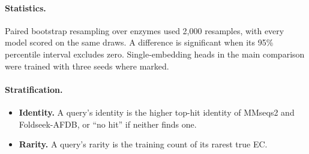 \documentclass[11pt]{article}
\begin{document}
\paragraph{Statistics.} Paired bootstrap resampling over enzymes \cite{efron1993} used 2,000 resamples, with every model
scored on the same draws. A difference is significant when its 95\% percentile interval excludes zero. Single-embedding
heads in the main comparison were trained with three seeds where marked.

\paragraph{Stratification.}
\begin{itemize}
  \item \textbf{Identity.} A query's identity is the higher top-hit identity of MMseqs2 and Foldseek-AFDB, or ``no hit''
        if neither finds one.
  \item \textbf{Rarity.} A query's rarity is the training count of its rarest true EC.
\end{itemize}
\end{document}
